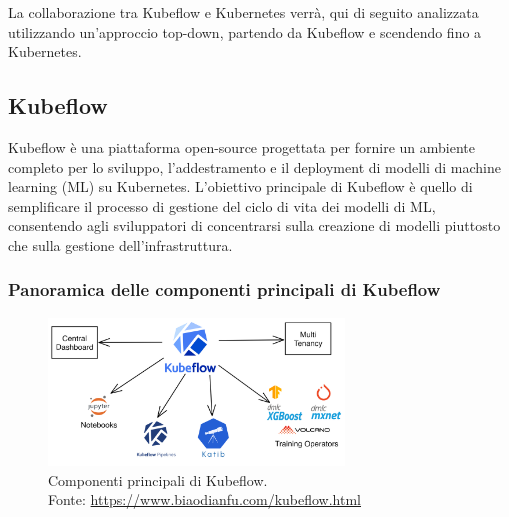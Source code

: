 La collaborazione tra Kubeflow e Kubernetes verrà, qui di seguito  analizzata utilizzando
un'approccio top-down, partendo da Kubeflow e scendendo fino a Kubernetes.\\

\subsection{Kubeflow}
Kubeflow è una piattaforma open-source progettata per fornire un ambiente completo
per lo sviluppo, l'addestramento e il deployment di modelli di machine learning (ML)
su Kubernetes. L'obiettivo principale di Kubeflow è quello di semplificare il processo
di gestione del ciclo di vita dei modelli di ML, consentendo agli sviluppatori
di concentrarsi sulla creazione di modelli piuttosto che sulla gestione dell'infrastruttura.\\

\clearpage
\subsubsection{Panoramica delle componenti principali di Kubeflow}
\begin{figure}[H]
    \centering
    \includegraphics[width=0.7\textwidth]{images/kubeflow-components.png}
        \caption{Componenti principali di Kubeflow.\\
        Fonte: \url{https://www.biaodianfu.com/kubeflow.html}}
    \label{fig:kubeflow-components}
\end{figure}

